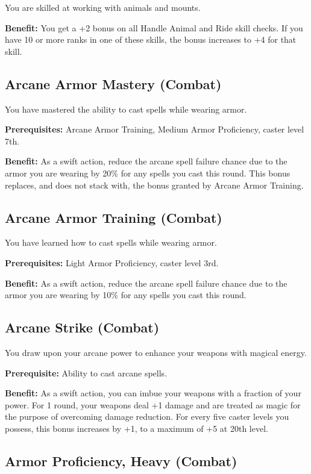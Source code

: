 				
You are skilled at working with animals and mounts.
				
\textbf{Benefit:} You get a +2 bonus on all Handle Animal and Ride skill checks. If you have 10 or more ranks in one of these skills, the bonus increases to +4 for that skill.
				
\subsection{Arcane Armor Mastery (Combat)}

				
You have mastered the ability to cast spells while wearing armor.
				
\textbf{Prerequisites:} Arcane Armor Training, Medium Armor Proficiency, caster level 7th.
				
\textbf{Benefit:} As a swift action, reduce the arcane spell failure chance due to the armor you are wearing by 20\% for any spells you cast this round. This bonus replaces, and does not stack with, the bonus granted by Arcane Armor Training.
				
\subsection{Arcane Armor Training (Combat)}

				
You have learned how to cast spells while wearing armor.
				
\textbf{Prerequisites:} Light Armor Proficiency, caster level 3rd.
				
\textbf{Benefit:} As a swift action, reduce the arcane spell failure chance due to the armor you are wearing by 10\% for any spells you cast this round.
				
\subsection{Arcane Strike (Combat)}

				
You draw upon your arcane power to enhance your weapons with magical energy.
				
\textbf{Prerequisite:} Ability to cast arcane spells.
				
\textbf{Benefit:} As a swift action, you can imbue your weapons with a fraction of your power. For 1 round, your weapons deal +1 damage and are treated as magic for the purpose of overcoming damage reduction. For every five caster levels you possess, this bonus increases by +1, to a maximum of +5 at 20th level.
				
\subsection{Armor Proficiency, Heavy (Combat)}

